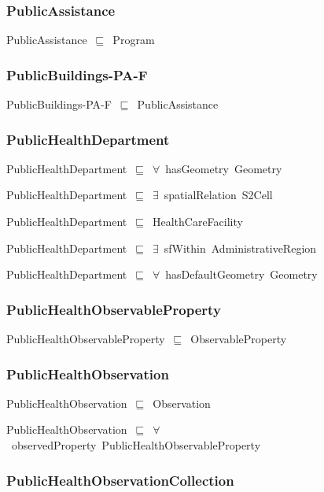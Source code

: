 \documentclass{article}
\begin{document}
\subsubsection*{PublicAssistance}

PublicAssistance~\ensuremath{\sqsubseteq}~Program~

\subsubsection*{PublicBuildings-PA-F}

PublicBuildings-PA-F~\ensuremath{\sqsubseteq}~PublicAssistance~

\subsubsection*{PublicHealthDepartment}

PublicHealthDepartment~\ensuremath{\sqsubseteq}~\ensuremath{\forall}~hasGeometry~Geometry~

PublicHealthDepartment~\ensuremath{\sqsubseteq}~\ensuremath{\exists}~spatialRelation~S2Cell~

PublicHealthDepartment~\ensuremath{\sqsubseteq}~HealthCareFacility~

PublicHealthDepartment~\ensuremath{\sqsubseteq}~\ensuremath{\exists}~sfWithin~AdministrativeRegion~

PublicHealthDepartment~\ensuremath{\sqsubseteq}~\ensuremath{\forall}~hasDefaultGeometry~Geometry~

\subsubsection*{PublicHealthObservableProperty}

PublicHealthObservableProperty~\ensuremath{\sqsubseteq}~ObservableProperty~

\subsubsection*{PublicHealthObservation}

PublicHealthObservation~\ensuremath{\sqsubseteq}~Observation~

PublicHealthObservation~\ensuremath{\sqsubseteq}~\ensuremath{\forall}~observedProperty~PublicHealthObservableProperty~

\subsubsection*{PublicHealthObservationCollection}
\end{document}
